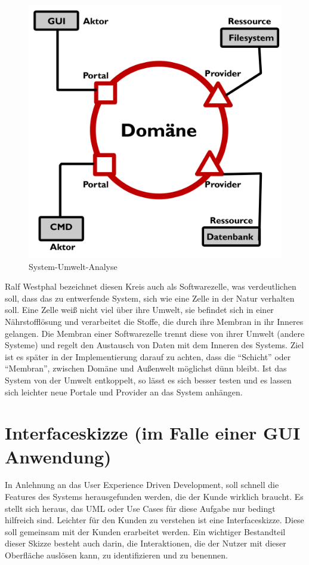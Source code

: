 \begin{figure}[H]
	\centering
	\includegraphics[width=.7\linewidth]{./img/cell.jpg}
	\caption{System-Umwelt-Analyse}
\end{figure}



Ralf Westphal bezeichnet diesen Kreis auch als Softwarezelle, was
verdeutlichen soll, dass das zu entwerfende System, sich wie eine Zelle in der
Natur verhalten soll. Eine Zelle weiß nicht viel über ihre Umwelt, sie befindet sich in
einer Nährstofflösung und verarbeitet die Stoffe, die durch ihre Membran in
ihr Inneres gelangen. Die Membran einer Softwarezelle trennt diese von
ihrer Umwelt (andere Systeme) und regelt den Austausch von Daten mit dem
Inneren des Systems. Ziel ist es später in der Implementierung darauf zu
achten, dass die \enquote{Schicht} oder \enquote{Membran}, zwischen Domäne und Außenwelt möglichst
dünn bleibt.
Ist das System von der Umwelt entkoppelt, so lässt es sich besser testen und es
lassen sich leichter neue Portale und Provider an das System anhängen.

\section{Interfaceskizze (im Falle einer GUI Anwendung)}

In Anlehnung an das User Experience Driven Development, soll schnell die
Features des Systems herausgefunden werden, die der Kunde wirklich
braucht. Es stellt sich heraus, das UML oder Use Cases für diese Aufgabe nur
bedingt hilfreich sind. Leichter für den Kunden zu verstehen ist eine
Interfaceskizze.
Diese soll gemeinsam mit der Kunden erarbeitet werden. Ein wichtiger Bestandteil
dieser Skizze besteht auch darin, die Interaktionen, die der
Nutzer mit dieser Oberfläche auslösen kann, zu identifizieren und zu benennen.

